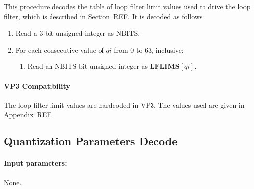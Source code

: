 \documentclass[11pt,letterpaper]{book}
\newcommand{\idx}[1]{{\ensuremath{\mathit{#1}}}}
\newcommand{\qi}{\idx{qi}}
\newcommand{\bitvar}[1]{\ensuremath{\mathbf{\bm #1}}}
\newcommand{\locvar}[1]{\ensuremath{\mathrm{#1}}}
\numberwithin{equation}{chapter}
\numberwithin{figure}{chapter}
\numberwithin{table}{chapter}
\begin{document}
This procedure decodes the table of loop filter limit values used to drive the
 loop filter, which is described in Section~REF.
It is decoded as follows:

\begin{enumerate}
\item
Read a 3-bit unsigned integer as \locvar{NBITS}.
\item
For each consecutive value of \locvar{\qi} from $0$ to $63$, inclusive:
\begin{enumerate}
\item
Read an \locvar{NBITS}-bit unsigned integer as $\bitvar{LFLIMS}[\locvar{\qi}]$.
\end{enumerate}
\end{enumerate}

\paragraph{VP3 Compatibility}

The loop filter limit values are hardcoded in VP3.
The values used are given in Appendix~REF.

\subsection{Quantization Parameters Decode}
\label{sub:quant-params}

\paragraph{Input parameters:} None.
\end{document}

